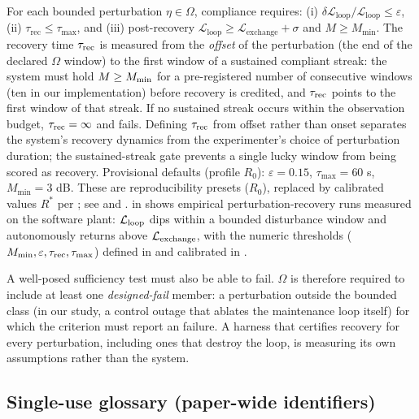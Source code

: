 \documentclass[11pt]{article}
\begin{document}
For each bounded perturbation $\eta \in \Omega$, compliance requires: (i) $\delta\mathcal{L}_{\text{loop}}/\mathcal{L}_{\text{loop}} \leq \varepsilon$, (ii) $\tau_{\text{rec}} \leq \tau_{\max}$, and (iii) post-recovery $\mathcal{L}_{\text{loop}} \geq \mathcal{L}_{\text{exchange}} + \sigma$ and $M \geq M_{\min}$. The recovery time $\tau_{\text{rec}}$ is measured from the \emph{offset} of the perturbation (the end of the declared $\Omega$ window) to the first window of a sustained compliant streak: the system must hold $M \geq M_{\min}$ for a pre-registered number of consecutive windows (ten in our implementation) before recovery is credited, and $\tau_{\text{rec}}$ points to the first window of that streak. If no sustained streak occurs within the observation budget, $\tau_{\text{rec}} = \infty$ and \SC fails. Defining $\tau_{\text{rec}}$ from offset rather than onset separates the system's recovery dynamics from the experimenter's choice of perturbation duration; the sustained-streak gate prevents a single lucky window from being scored as recovery. Provisional defaults (profile $R_0$): $\varepsilon = 0.15$, $\tau_{\max} = 60$ s, $M_{\min} = 3$ dB. These are reproducibility presets ($R_0$), replaced by calibrated values $R^*$ per ; see  and .  in  shows empirical perturbation-recovery runs measured on the software plant: $\mathcal{L}_{\text{loop}}$ dips within a bounded disturbance window and autonomously returns above $\mathcal{L}_{\text{exchange}}$, with the numeric thresholds ($M_{\min}, \varepsilon, \tau_{\text{rec}}, \tau_{\max}$) defined in  and calibrated in .

A well-posed sufficiency test must also be able to fail. $\Omega$ is therefore required to include at least one \emph{designed-fail} member: a perturbation outside the bounded class (in our study, a control outage that ablates the maintenance loop itself) for which the criterion must report an \SC failure. A harness that certifies recovery for every perturbation, including ones that destroy the loop, is measuring its own assumptions rather than the system.

\subsection{Single-use glossary (paper-wide identifiers)}
\label{sec:glossary}
\end{document}
